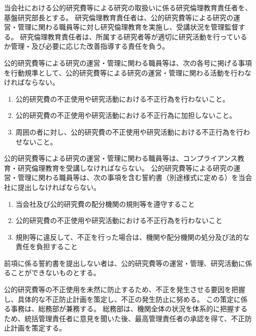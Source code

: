 \documentclass[10pt,a4paper,uplatex]{jsarticle}
\begin{document}
当会社における公的研究費等による研究の取扱いに係る研究倫理教育責任者を、基盤研究部長とする。
\term 研究倫理教育責任者は、公的研究費等による研究の運営・管理に関わる職員等に対し研究倫理教育を実施し、受講状況を管理監督する。
\term 研究倫理教育責任者は、所属する研究者等が適切に研究活動を行っているか管理・及び必要に応じた改善指導する責任を負う。

公的研究費等による研究の運営・管理に関わる職員等は、次の各号に掲げる事項を行動規準として、公的研究費等による研究の運営・管理に関わる活動を行わなければならない。
\begin{enumerate}
	\item 公的研究費の不正使用や研究活動における不正行為を行わないこと。
	\item 公的研究費の不正使用や研究活動における不正行為に加担しないこと。
	\item 周囲の者に対し、公的研究費の不正使用や研究活動における不正行為を行わせないこと。
\end{enumerate}
\term 公的研究費等による研究の運営・管理に関わる職員等は、コンプライアンス教育・研究倫理教育を受講しなければならない。
\term 公的研究費等による研究の運営・管理に関わる職員等は、次の事項を含む誓約書（別途様式に定める）を当会社に提出しなければならない。
\begin{enumerate}
	\item 当会社及び公的研究費の配分機関の規則等を遵守すること
	\item 公的研究費の不正使用や研究活動における不正行為を行わないこと
	\item 規則等に違反して、不正を行った場合は、機関や配分機関の処分及び法的な責任を負担すること 
\end{enumerate}
\term 前項に係る誓約書を提出しない者は、公的研究費等の運営・管理、研究活動に係ることができないものとする。

公的研究費等の不正使用を未然に防止するため、不正を発生させる要因を把握し、具体的な不正防止計画を策定し、不正の発生防止に努める。
\term この策定に係る事務は、総務部が兼務する。
\term 総務部は、機関全体の状況を体系的に把握するため、統括管理責任者に意見を聞いた後、最高管理責任者の承認を得て、不正防止計画を策定する。
\end{document}

